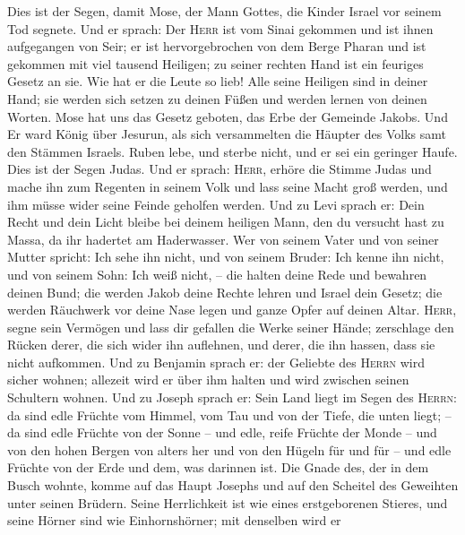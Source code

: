  Dies ist der Segen, damit Mose, der Mann Gottes, die
Kinder Israel vor seinem Tod segnete.  Und er sprach: Der
\textsc{Herr} ist vom Sinai gekommen und ist ihnen aufgegangen von Seir;
er ist hervorgebrochen von dem Berge Pharan und ist gekommen mit viel
tausend Heiligen; zu seiner rechten Hand ist ein feuriges Gesetz an sie.
 Wie hat er die Leute so lieb! Alle seine Heiligen sind in
deiner Hand; sie werden sich setzen zu deinen Füßen und werden lernen
von deinen Worten.  Mose hat uns das Gesetz geboten, das
Erbe der Gemeinde Jakobs.  Und Er ward König über Jesurun,
als sich versammelten die Häupter des Volks samt den Stämmen Israels.
 Ruben lebe, und sterbe nicht, und er sei ein geringer
Haufe.  Dies ist der Segen Judas. Und er sprach:
\textsc{Herr}, erhöre die Stimme Judas und mache ihn zum Regenten in
seinem Volk und lass seine Macht groß werden, und ihm müsse wider seine
Feinde geholfen werden.  Und zu Levi sprach er: Dein Recht
und dein Licht bleibe bei deinem heiligen Mann, den du versucht hast zu
Massa, da ihr hadertet am Haderwasser.  Wer von seinem
Vater und von seiner Mutter spricht: Ich sehe ihn nicht, und von seinem
Bruder: Ich kenne ihn nicht, und von seinem Sohn: Ich weiß nicht, -- die
halten deine Rede und bewahren deinen Bund;  die werden
Jakob deine Rechte lehren und Israel dein Gesetz; die werden Räuchwerk
vor deine Nase legen und ganze Opfer auf deinen Altar. 
\textsc{Herr}, segne sein Vermögen und lass dir gefallen die Werke
seiner Hände; zerschlage den Rücken derer, die sich wider ihn auflehnen,
und derer, die ihn hassen, dass sie nicht aufkommen.  Und
zu Benjamin sprach er: der Geliebte des \textsc{Herrn} wird sicher
wohnen; allezeit wird er über ihm halten und wird zwischen seinen
Schultern wohnen.  Und zu Joseph sprach er: Sein Land
liegt im Segen des \textsc{Herrn}: da sind edle Früchte vom Himmel, vom
Tau und von der Tiefe, die unten liegt; --  da sind edle
Früchte von der Sonne -- und edle, reife Früchte der Monde --
 und von den hohen Bergen von alters her und von den
Hügeln für und für --  und edle Früchte von der Erde und
dem, was darinnen ist. Die Gnade des, der in dem Busch wohnte, komme auf
das Haupt Josephs und auf den Scheitel des Geweihten unter seinen
Brüdern.  Seine Herrlichkeit ist wie eines erstgeborenen
Stieres, und seine Hörner sind wie Einhornshörner; mit denselben wird er
